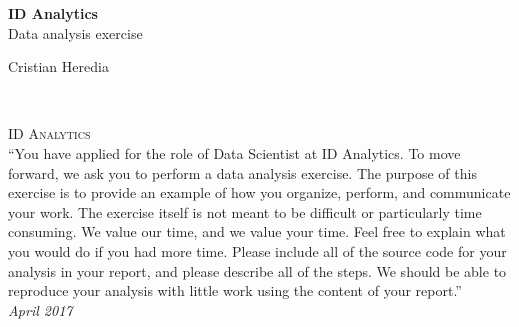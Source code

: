 \documentclass[12pt,fleqn]{report} %
\begin{document}

\begingroup
\thispagestyle{empty}
\centering
\vspace*{5cm}
\par\normalfont\fontsize{35}{35}\sffamily\selectfont
\textbf{ID Analytics}\\
{\LARGE Data analysis exercise}\par %
\vspace*{1cm}
{\Huge Cristian Heredia}\par %
\endgroup


\newpage
~\vfill
\thispagestyle{empty}


\noindent \textsc{ID Analytics}\\


\noindent ``You have applied for the role of Data Scientist at ID Analytics. To move forward, we ask you to perform a data analysis exercise. The purpose of this exercise is to provide an example of how you organize, perform, and communicate your work. The exercise itself is not meant to be difficult or particularly time consuming. We value our time, and we value your time. Feel free to explain what you would do if you had more time. Please include all of the source code for your analysis in your report, and please describe all of the steps. We should be able to reproduce your analysis with little work using the content of your report.''\\ %

\noindent \textit{April 2017} %

\end{document}

